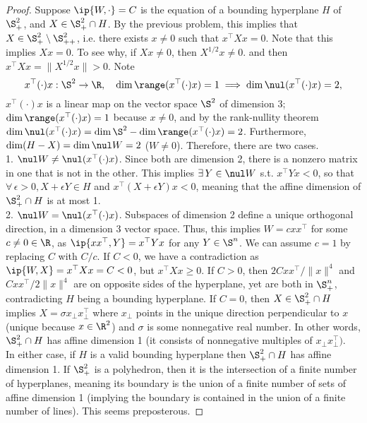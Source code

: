 \documentclass[../borwein-lewis_notes.tex]{subfiles}
\begin{document}
\begin{proof}
Suppose $\ip{W,\cdot}=C$ is the equation of
 a bounding hyperplane $H$ of $\S_+^2$, and 
$X\in\S_+^2\cap H$. 
By the previous problem, this implies that $X\in\S_+^2\setminus\S_{
++}^2$, i.e. there exists $x\neq 0$ such that $x^\top X x = 0$.
Note that this implies $Xx=0$. To see why, if $Xx\neq 0$, then 
$X^{1/2}x\neq 0$. and then $x^\top Xx = \|X^{1/2}x\|>0$. Note 
\begin{equation*}
x^\top (\cdot)x :\S^2 \to \R, \quad \dim\range(x^\top
(\cdot)x)=1 
\implies \dim\nul(x^\top(\cdot)x) = 2,
\end{equation*}
$x^\top(\cdot)x$ is a linear map on the vector space 
$\S^2$ of dimension 3; $\dim\range(x^\top(\cdot)x)=1$
 because $x\neq 0$, and 
by the rank-nullity theorem $\dim\nul(x^\top(\cdot)x) = \dim\S^2-
\dim\range(x^\top(\cdot)x) = 2$. Furthermore, $\dim(H-X) = 
\dim\nul W = 2$ ($W\neq0$). Therefore, there are two cases. \\
1. $\nul W \neq \nul(x^\top(\cdot)x)$. Since both are dimension 2, 
there is a nonzero matrix in one that is not in the other. This 
implies $\exists\,Y\in\nul W$ s.t. $x^\top Y x < 0$, so that $\forall
\,\epsilon >0, X+\epsilon Y\in H$ and 
$x^\top(X +\epsilon Y)x < 0$, meaning that the affine dimension of 
$\S_+^2\cap H$ is at most 1. \\
2. $\nul W = \nul(x^\top(\cdot) x)$. Subspaces of dimension 2 define 
a unique orthogonal direction, in a dimension 3 vector space. Thus, 
this implies $W=cxx^\top$ for some $c\neq0\in\R$, as $\ip{xx^\top, Y}
= x^\top Y x$ for any $Y\in\S^n$. We can assume $c=1$ by replacing 
$C$ with $C/c$. If $C < 0$, we have a contradiction as 
$\ip{W, X} = x^\top X x = C < 0$, but $x^\top X x \geq 0$. If 
$C > 0$, then $2Cxx^\top/\|x\|^4$ and $Cxx^\top/2\|x\|^4$ are on 
opposite sides of the hyperplane, yet are both in $\S_+^n$, contradicting
$H$ being a bounding hyperplane. If $C=0$, then $X\in\S_+^2\cap H$ 
implies $X=\sigma x_{\perp}x_{\perp}^\top$ where $x_{\perp}$ points in 
the unique direction perpendicular 
to $x$ (unique because $x\in\R^2$) 
and $\sigma$ is some nonnegative real number. In other words, 
$\S_+^2\cap H$ has affine dimension 1 (it consists of nonnegative 
multiples of $x_{\perp}x_{\perp}^\top)$. \\
In either case, if $H$ is a valid bounding hyperplane then 
$\S_+^2\cap H$ has affine dimension 1. If $\S_+^2$ is a polyhedron,
then it is the intersection of a finite number of hyperplanes, 
meaning its boundary is the union of a finite number of sets of 
affine dimension 1 (implying the boundary is contained in the union 
of a finite number of lines). This seems preposterous.
\end{proof}
\end{document}
